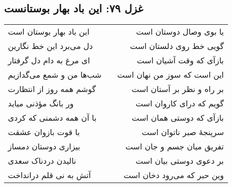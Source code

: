 \begin{center}
\section*{غزل ۷۹: این باد بهار بوستانست}
\label{sec:079}
\begin{longtable}{l p{0.5cm} r}
این باد بهار بوستان است
&&
یا بوی وصال دوستان است
\\
دل می‌برد این خط نگارین
&&
گویی خط روی دلستان است
\\
ای مرغ به دام دل گرفتار
&&
بازآی که وقت آشیان است
\\
شب‌ها من و شمع می‌گدازیم
&&
این است که سوز من نهان است
\\
گوشم همه روز از انتظارت
&&
بر راه و نظر بر آستان است
\\
ور بانگ مؤذنی میاید
&&
گویم که درای کاروان است
\\
با آن همه دشمنی که کردی
&&
بازآی که دوستی همان است
\\
با قوت بازوان عشقت
&&
سرپنجهٔ صبر ناتوان است
\\
بیزاری دوستان دمساز
&&
تفریق میان جسم و جان است
\\
نالیدن دردناک سعدی
&&
بر دعوی دوستی بیان است
\\
آتش به نی قلم درانداخت
&&
وین حبر که می‌رود دخان است
\\
\end{longtable}
\end{center}
